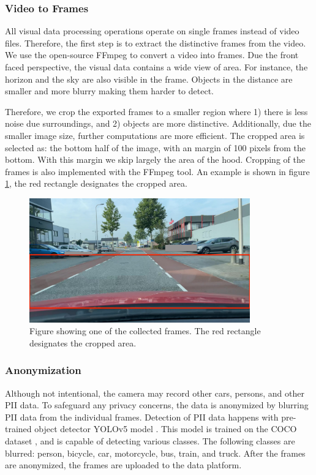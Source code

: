 \subsubsection{Video to Frames}
All visual data processing operations operate on single frames instead of video files. Therefore, the first step is to extract the distinctive frames from the video. We use the open-source FFmpeg \cite{ffmpeg} to convert a video into frames. Due the front faced perspective, the visual data contains a wide view of area. For instance, the horizon and the sky are also visible in the frame. Objects in the distance are smaller and more blurry making them harder to detect.

Therefore, we crop the exported frames to a smaller region where 1) there is less noise due surroundings, and 2) objects are more distinctive. Additionally, due the smaller image size, further computations are more efficient. The cropped area is selected as: the bottom half of the image, with an margin of 100 pixels from the bottom. With this margin we skip largely the area of the hood. Cropping of the frames is also implemented with the FFmpeg tool. An example is shown in figure \ref{fig:cropped-frame}, the red rectangle designates the cropped area. 

\begin{figure}[ht]
\centering
\includegraphics[width=0.85\textwidth,keepaspectratio]{images/4_data/crop-screenshot.png}
\captionsetup{width=.90\textwidth}
\caption{Figure showing one of the collected frames. The red rectangle designates the cropped area.}
\label{fig:cropped-frame}
\end{figure}



\subsubsection{Anonymization}
Although not intentional, the camera may record other cars, persons, and other PII data. To safeguard any privacy concerns, the data is anonymized by blurring PII data from the individual frames. Detection of PII data happens with pre-trained object detector YOLOv5 model \cite{Jocher2021}. This model is trained on the COCO dataset \cite{COCO}, and is capable of detecting various classes. The following classes are blurred: person, bicycle, car, motorcycle, bus, train, and truck. After the frames are anonymized, the frames are uploaded to the data platform.


